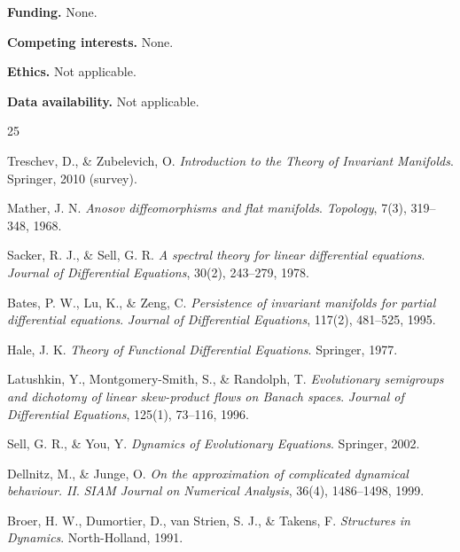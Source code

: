 \documentclass[11pt,a4paper]{article}
\theoremstyle{plain}
\theoremstyle{definition}
\theoremstyle{remark}
\numberwithin{equation}{section}
\numberwithin{figure}{section}
\begin{document}
\noindent \textbf{Funding.} None.

\vspace{0.5em}

\noindent \textbf{Competing interests.} None.

\vspace{0.5em}

\noindent \textbf{Ethics.} Not applicable.

\vspace{0.5em}

\noindent \textbf{Data availability.} Not applicable.

\begin{thebibliography}{25}

 Treschev, D., \& Zubelevich, O. \textit{Introduction to the Theory of Invariant Manifolds}. Springer, 2010 (survey).

 Mather, J. N. \textit{Anosov diffeomorphisms and flat manifolds}. \textit{Topology}, 7(3), 319–348, 1968.

 Sacker, R. J., \& Sell, G. R. \textit{A spectral theory for linear differential equations}. \textit{Journal of Differential Equations}, 30(2), 243–279, 1978.

 Bates, P. W., Lu, K., \& Zeng, C. \textit{Persistence of invariant manifolds for partial differential equations}. \textit{Journal of Differential Equations}, 117(2), 481–525, 1995.

 Hale, J. K. \textit{Theory of Functional Differential Equations}. Springer, 1977.

 Latushkin, Y., Montgomery-Smith, S., \& Randolph, T. \textit{Evolutionary semigroups and dichotomy of linear skew-product flows on Banach spaces}. \textit{Journal of Differential Equations}, 125(1), 73–116, 1996.

 Sell, G. R., \& You, Y. \textit{Dynamics of Evolutionary Equations}. Springer, 2002.

 Dellnitz, M., \& Junge, O. \textit{On the approximation of complicated dynamical behaviour. II}. \textit{SIAM Journal on Numerical Analysis}, 36(4), 1486–1498, 1999.

 Broer, H. W., Dumortier, D., van Strien, S. J., \& Takens, F. \textit{Structures in Dynamics}. North-Holland, 1991.


\end{thebibliography}
\end{document}
